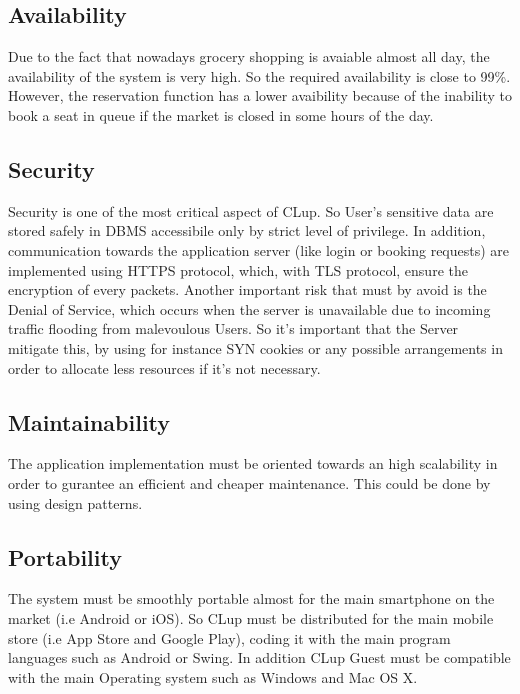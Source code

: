 \subsection{Availability}
Due to the fact that nowadays grocery shopping is avaiable almost all day, the availability of the system is very high. So the required availability is close to 99\%. However, the reservation function has a lower avaibility because of the inability to book a seat in queue if the market is closed in some hours of the day. 
\subsection{Security}
Security is one of the most critical aspect of CLup. So User's sensitive data are stored safely in DBMS accessibile only by strict level of privilege. In addition, communication towards the application server (like login or booking requests) are implemented using  HTTPS protocol, which, with TLS protocol, ensure the encryption of every packets. Another important risk that must by avoid is the Denial of Service, which occurs when the server is unavailable due to incoming traffic flooding from malevoulous Users. So it's important that the Server mitigate this, by using for instance SYN cookies or any possible arrangements in order to allocate less resources if it's not necessary.
\subsection{Maintainability}
The application implementation must be oriented towards an high scalability in order to gurantee an efficient and cheaper maintenance. This could be done by using design patterns.
\subsection{Portability}
The system must be smoothly portable almost for the main smartphone on the market (i.e Android or iOS). So CLup must be distributed for the main mobile store (i.e App Store and Google Play), coding it with the main program languages such as Android or Swing. In addition CLup Guest
must be compatible with the main Operating system such as Windows and Mac OS X. 